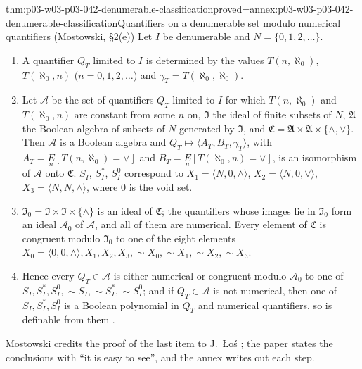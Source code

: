\begin{hbtheorem}{thm:p03-w03-p03-042-denumerable-classification}{proved=annex:p03-w03-p03-042-denumerable-classification}{Quantifiers on a denumerable set modulo numerical quantifiers (Mostowski, \S2(e))}
Let \(I\) be denumerable and \(N=\{0,1,2,\ldots\}\).
\begin{enumerate}
\item A quantifier \(Q_T\) limited to \(I\) is determined by the values
      \(T(n,\aleph_0)\), \(T(\aleph_0,n)\) (\(n=0,1,2,\ldots\)) and
      \(\gamma_T=T(\aleph_0,\aleph_0)\).
\item Let \(\mathcal A\) be the set of quantifiers \(Q_T\) limited to \(I\)
      for which \(T(n,\aleph_0)\) and \(T(\aleph_0,n)\) are constant from
      some \(n\) on, \(\mathfrak I\) the ideal of finite subsets of \(N\),
      \(\mathfrak A\) the Boolean algebra of subsets of \(N\) generated by
      \(\mathfrak I\), and \(\mathfrak C=\mathfrak A\times\mathfrak A\times
      \{\wedge,\vee\}\).  Then \(\mathcal A\) is a Boolean algebra and
      \(Q_T\mapsto\langle A_T,B_T,\gamma_T\rangle\), with
      \(A_T=\underset{n}{E}[T(n,\aleph_0)=\vee]\) and
      \(B_T=\underset{n}{E}[T(\aleph_0,n)=\vee]\), is an isomorphism of
      \(\mathcal A\) onto \(\mathfrak C\).  \(S_I\), \(S_I^{*}\), \(S_I^0\)
      correspond to \(X_1=\langle N,0,\wedge\rangle\),
      \(X_2=\langle N,0,\vee\rangle\), \(X_3=\langle N,N,\wedge\rangle\),
      where \(0\) is the void set.
\item \(\mathfrak I_0=\mathfrak I\times\mathfrak I\times\{\wedge\}\) is an
      ideal of \(\mathfrak C\); the quantifiers whose images lie in
      \(\mathfrak I_0\) form an ideal \(\mathcal A_0\) of \(\mathcal A\), and
      all of them are numerical.  Every element of \(\mathfrak C\) is
      congruent modulo \(\mathfrak I_0\) to one of the eight elements
      \(X_0=\langle0,0,\wedge\rangle,X_1,X_2,X_3,{\sim}X_0,{\sim}X_1,
      {\sim}X_2,{\sim}X_3\).
\item Hence every \(Q_T\in\mathcal A\) is either numerical or congruent
      modulo \(\mathcal A_0\) to one of \(S_I,S^{*}_I,S^0_I,{\sim}S_I,
      {\sim}S^{*}_I,{\sim}S^0_I\); and if \(Q_T\in\mathcal A\) is not
      numerical, then one of \(S_I,S^{*}_I,S^0_I\) is a Boolean polynomial
      in \(Q_T\) and numerical quantifiers, so is definable from them
      \cite[p.~15]{Mostowski1957}.
\end{enumerate}
\end{hbtheorem}

Mostowski credits the proof of the last item to J.~\L{}o\'s
\cite[p.~15, note~6]{Mostowski1957}; the paper states the conclusions
with ``it is easy to see'', and the annex writes out each step.


